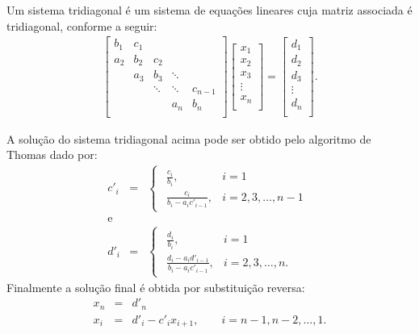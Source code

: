 \begin{exer}\label{TDMA0}Um sistema tridiagonal é um sistema de equações lineares cuja matriz associada é tridiagonal, conforme a seguir:
\begin{eqnarray*}\label{linsis:EqTriDiag} \begin{bmatrix}
   {b_1} & {c_1} & {   } & {   } & {   } \\
   {a_2} & {b_2} & {c_2} & {   } & {   } \\
   {   } & {a_3} & {b_3} & \ddots & {   } \\
   {   } & {   } & \ddots & \ddots & {c_{n-1}}\\
   {   } & {   } & {   } & {a_n} & {b_n}\\
\end{bmatrix}
\begin{bmatrix}
   {x_1 }  \\
   {x_2 }  \\
   {x_3 }  \\
   \vdots   \\
   {x_n }  \\
\end{bmatrix}
=
\begin{bmatrix}
   {d_1 }  \\
   {d_2 }  \\
   {d_3 }  \\
   \vdots   \\
   {d_n }  \\
\end{bmatrix}
.
\end{eqnarray*}


A solução do sistema tridiagonal acima pode ser obtido pelo algoritmo de Thomas dado por:
\begin{eqnarray*}\label{linsis:TriDiag_1}
 c'_i &=&
\begin{cases}
\begin{array}{lcl}
  \frac{c_i}{b_i}                   , & i = 1 \\
  \frac{c_i}{b_i - a_i c'_{i - 1}}  , & i = 2, 3, \dots, n-1
\end{array}
\end{cases}\\
\text{e}\nonumber\\
d'_i &=&
\begin{cases}
\begin{array}{lcl}
  \frac{d_i}{b_i}                   , & i = 1 \\
  \frac{d_i - a_i d'_{i - 1}}{b_i - a_i c'_{i - 1}}  , & i = 2, 3, \dots, n.
\end{array}
\end{cases}
\end{eqnarray*}
Finalmente a solução final é obtida por substituição reversa:
\begin{eqnarray*}\label{linsis:TriDiag_2}
x_n &=& d'_n\\
 x_i &=& d'_i - c'_i x_{i + 1}, \qquad   i = n - 1, n - 2, \ldots, 1.
\end{eqnarray*}


\end{exer}
